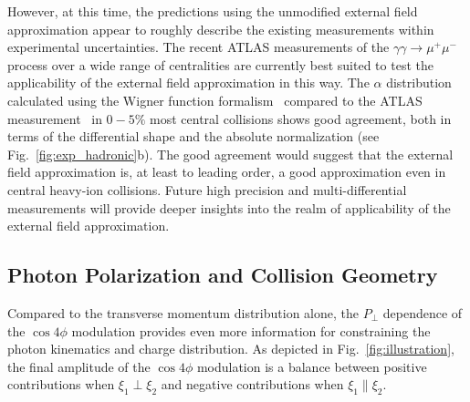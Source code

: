 \documentclass[12pt,epjc3]{svjour3}\sloppy
\begin{document}
However, at this time, the predictions using the unmodified external field approximation appear to roughly describe the existing measurements within experimental uncertainties. The recent ATLAS measurements of the $\gamma\gamma \rightarrow \mu^+\mu^-$ process over a wide range of centralities are currently best suited to test the applicability of the external field approximation in this way. The $\alpha$ distribution calculated using the Wigner function formalism~\cite{klusek-gawendaCentralityDependenceDilepton2021} compared to the ATLAS measurement~\cite{atlascollaborationObservationCentralityDependentAcoplanarity2018a} in $0-5\%$ most central collisions shows good agreement, both in terms of the differential shape and the absolute normalization (see Fig.~\ref{fig:exp_hadronic}b). The good agreement would suggest that the external field approximation is, at least to leading order, a good approximation even in central heavy-ion collisions. Future high precision and multi-differential measurements will provide deeper insights into the realm of applicability of the external field approximation.

\subsection{Photon Polarization and Collision Geometry}
Compared to the transverse momentum distribution alone, the $P_\perp$ dependence of the $\cos4\phi$ modulation provides even more information for constraining the photon kinematics and charge distribution. As depicted in Fig.~\ref{fig:illustration}, the final amplitude of the $\cos4\phi$ modulation is a balance between positive contributions when $\xi_1 \perp \xi_2$ and negative contributions when $\xi_1 \parallel \xi_2$. 
\end{document}
